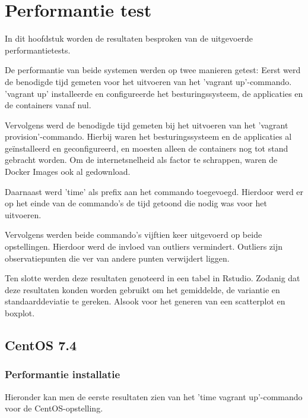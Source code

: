 
\chapter{Performantie test}
\label{ch:performantietest}

In dit hoofdstuk worden de resultaten besproken van de uitgevoerde performantietests.

De performantie van beide systemen werden op twee manieren getest:
Eerst werd de benodigde tijd gemeten voor het uitvoeren van het 'vagrant up'-commando. 'vagrant up' installeerde en configureerde het besturingssysteem, de applicaties en de containers vanaf nul.

Vervolgens werd de benodigde tijd gemeten bij het uitvoeren van het 'vagrant provision'-commando. Hierbij waren het besturingssysteem en de applicaties al geïnstalleerd en geconfigureerd, en moesten alleen de containers nog tot stand gebracht worden. Om de internetsnelheid als factor te schrappen, waren de Docker Images ook al gedownload.

Daarnaast werd 'time' als prefix aan het commando toegevoegd. Hierdoor werd er op het einde van de commando's de tijd getoond die nodig was voor het uitvoeren.

Vervolgens werden beide commando's vijftien keer uitgevoerd op beide opstellingen. Hierdoor werd de invloed van outliers vermindert. Outliers zijn observatiepunten die ver van andere punten verwijdert liggen.

Ten slotte werden deze resultaten genoteerd in een tabel in Rstudio. Zodanig dat deze resultaten konden worden gebruikt om het gemiddelde, de variantie en standaarddeviatie te gereken. Alsook voor het generen van een scatterplot en boxplot.

\section{CentOS 7.4}

\subsection{Performantie installatie}
Hieronder kan men de eerste resultaten zien van het 'time vagrant up'-commando voor de CentOS-opstelling.

